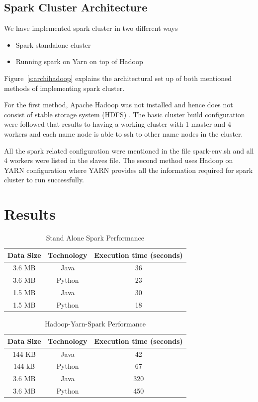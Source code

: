 \subsection{Spark Cluster Architecture}

We have implemented spark cluster in two different ways

\begin{itemize}

\item Spark standalone cluster
\item Running spark on Yarn on top of Hadoop

\end{itemize}

Figure~\ref{s:archihadoop} explains the architectural set up of both 
mentioned methods of implementing spark cluster.

For the first method, Apache Hadoop was not installed and hence does not consist
 of stable storage system (HDFS) . The basic cluster build configuration were 
 followed that results to having a working cluster with 1 master and 4 
 workers and each name node is able to ssh to other name nodes in the cluster. 

All the spark related configuration were mentioned in the file spark-env.sh and 
all 4 workers were listed in the slaves file.
The second method uses Hadoop on YARN configuration where YARN provides all the 
information required for spark cluster to run successfully.


\section{Results}

\begin{table}[hbt]
\centering
\caption{Stand Alone Spark Performance}\label{t:results-table}
    \begin{tabular}{ | c | c | c |}
    \hline
    Data Size & Technology & Execution time (seconds) \\ \hline
    3.6 MB & Java & 36 \\ \hline
    3.6 MB & Python & 23\\ \hline
    1.5 MB & Java & 30 \\ \hline
    1.5 MB & Python & 18 \\
    \hline
    \end{tabular}
\end{table}


\begin{table}[hbt]
\centering
\caption{Hadoop-Yarn-Spark Performance}\label{t:results-table2}
    \begin{tabular}{ | c | c | c |}
    \hline
    Data Size & Technology & Execution time (seconds) \\ \hline
    144 KB & Java & 42   \\ \hline
    144 kB & Python & 67 \\ \hline
    3.6 MB & Java &  320  \\ \hline
    3.6 MB & Python & 450 \\
    \hline
    \end{tabular} 
\end{table}


